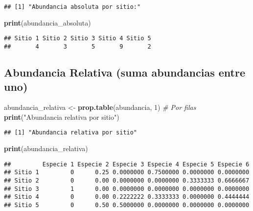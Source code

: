 \documentclass[
]{article}
\newenvironment{Shaded}{\begin{snugshade}}{\end{snugshade}}
\newcommand{\CommentTok}[1]{\textcolor[rgb]{0.56,0.35,0.01}{\textit{#1}}}
\newcommand{\DecValTok}[1]{\textcolor[rgb]{0.00,0.00,0.81}{#1}}
\newcommand{\FunctionTok}[1]{\textcolor[rgb]{0.13,0.29,0.53}{\textbf{#1}}}
\newcommand{\NormalTok}[1]{#1}
\newcommand{\OtherTok}[1]{\textcolor[rgb]{0.56,0.35,0.01}{#1}}
\newcommand{\StringTok}[1]{\textcolor[rgb]{0.31,0.60,0.02}{#1}}
\begin{document}
\begin{verbatim}
## [1] "Abundancia absoluta por sitio:"
\end{verbatim}

\begin{Shaded}
\begin{Highlighting}[]
\FunctionTok{print}\NormalTok{(abundancia\_absoluta)}
\end{Highlighting}
\end{Shaded}

\begin{verbatim}
## Sitio 1 Sitio 2 Sitio 3 Sitio 4 Sitio 5 
##       4       3       5       9       2
\end{verbatim}

\hypertarget{abundancia-relativa-suma-abundancias-entre-uno}{%
\subsection{Abundancia Relativa (suma abundancias entre
uno)}\label{abundancia-relativa-suma-abundancias-entre-uno}}

\begin{Shaded}
\begin{Highlighting}[]
\NormalTok{abundancia\_relativa }\OtherTok{\textless{}{-}} \FunctionTok{prop.table}\NormalTok{(abundancia, }\DecValTok{1}\NormalTok{) }\CommentTok{\# Por filas}
\FunctionTok{print}\NormalTok{(}\StringTok{"Abundancia relativa por sitio"}\NormalTok{)}
\end{Highlighting}
\end{Shaded}

\begin{verbatim}
## [1] "Abundancia relativa por sitio"
\end{verbatim}

\begin{Shaded}
\begin{Highlighting}[]
\FunctionTok{print}\NormalTok{(abundancia\_relativa)}
\end{Highlighting}
\end{Shaded}

\begin{verbatim}
##         Especie 1 Especie 2 Especie 3 Especie 4 Especie 5 Especie 6
## Sitio 1         0      0.25 0.0000000 0.7500000 0.0000000 0.0000000
## Sitio 2         0      0.00 0.0000000 0.0000000 0.3333333 0.6666667
## Sitio 3         1      0.00 0.0000000 0.0000000 0.0000000 0.0000000
## Sitio 4         0      0.00 0.2222222 0.3333333 0.0000000 0.4444444
## Sitio 5         0      0.50 0.5000000 0.0000000 0.0000000 0.0000000
\end{verbatim}
\end{document}
